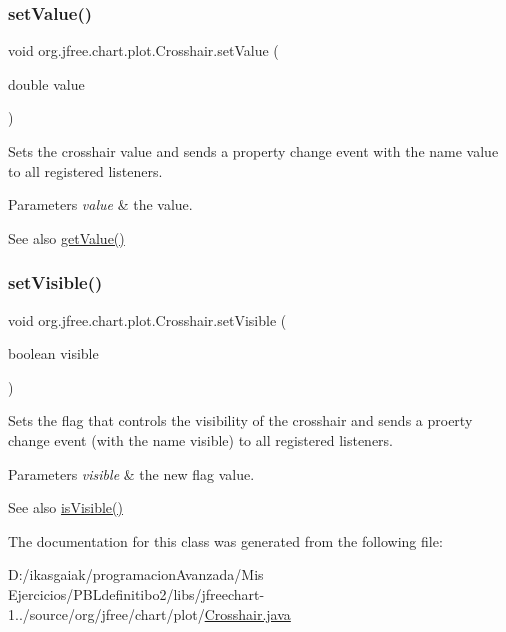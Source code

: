 \subsubsection{\texorpdfstring{set\+Value()}{setValue()}}
{\footnotesize\ttfamily void org.\+jfree.\+chart.\+plot.\+Crosshair.\+set\+Value (\begin{DoxyParamCaption}\item[{double}]{value }\end{DoxyParamCaption})}

Sets the crosshair value and sends a property change event with the name \textquotesingle{}value\textquotesingle{} to all registered listeners.


\begin{DoxyParams}{Parameters}
{\em value} & the value.\\
\hline
\end{DoxyParams}
\begin{DoxySeeAlso}{See also}
\mbox{\hyperlink{classorg_1_1jfree_1_1chart_1_1plot_1_1_crosshair_aa27be6dd0ed5c8fdf98c00a2e34c98e0}{get\+Value()}} 
\end{DoxySeeAlso}
\mbox{\label{classorg_1_1jfree_1_1chart_1_1plot_1_1_crosshair_aa51f9dff848ea3bc68eb000379f41bd3}} 
\subsubsection{\texorpdfstring{set\+Visible()}{setVisible()}}
{\footnotesize\ttfamily void org.\+jfree.\+chart.\+plot.\+Crosshair.\+set\+Visible (\begin{DoxyParamCaption}\item[{boolean}]{visible }\end{DoxyParamCaption})}

Sets the flag that controls the visibility of the crosshair and sends a proerty change event (with the name \textquotesingle{}visible\textquotesingle{}) to all registered listeners.


\begin{DoxyParams}{Parameters}
{\em visible} & the new flag value.\\
\hline
\end{DoxyParams}
\begin{DoxySeeAlso}{See also}
\mbox{\hyperlink{classorg_1_1jfree_1_1chart_1_1plot_1_1_crosshair_aebe636459c5fdca37f13bedfd0a070f8}{is\+Visible()}} 
\end{DoxySeeAlso}


The documentation for this class was generated from the following file\+:\begin{DoxyCompactItemize}
\item 
D\+:/ikasgaiak/programacion\+Avanzada/\+Mis Ejercicios/\+P\+B\+Ldefinitibo2/libs/jfreechart-\/1../source/org/jfree/chart/plot/\mbox{\hyperlink{_crosshair_8java}{Crosshair.\+java}}\end{DoxyCompactItemize}
